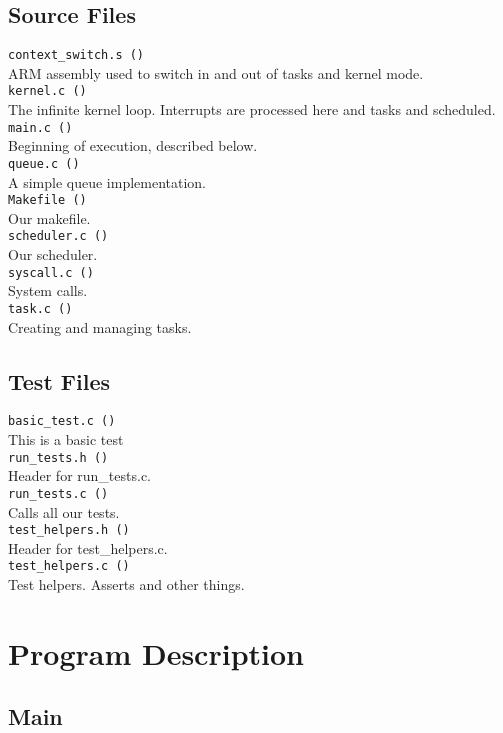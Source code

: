 \documentclass[letterpaper]{article}
\begin{document}
\subsection{Source Files}
\verb!context_switch.s ()!\\
ARM assembly used to switch in and out of tasks and kernel mode.\\
\verb!kernel.c ()!\\
The infinite kernel loop. Interrupts are processed here and tasks and scheduled.\\
\verb!main.c ()!\\
Beginning of execution, described below.\\
\verb!queue.c ()!\\
A simple queue implementation.\\
\verb!Makefile ()!\\
Our makefile.\\
\verb!scheduler.c ()!\\
Our scheduler.\\
\verb!syscall.c ()!\\
System calls.\\
\verb!task.c ()!\\
Creating and managing tasks.\\

\subsection{Test Files}
\verb!basic_test.c ()!\\
This is a basic test\\
\verb!run_tests.h ()!\\
Header for run\_tests.c.\\
\verb!run_tests.c ()!\\
Calls all our tests.\\
\verb!test_helpers.h ()!\\
Header for test\_helpers.c.\\
\verb!test_helpers.c ()!\\
Test helpers. Asserts and other things.

\section{Program Description}

\subsection{Main}
\end{document}
